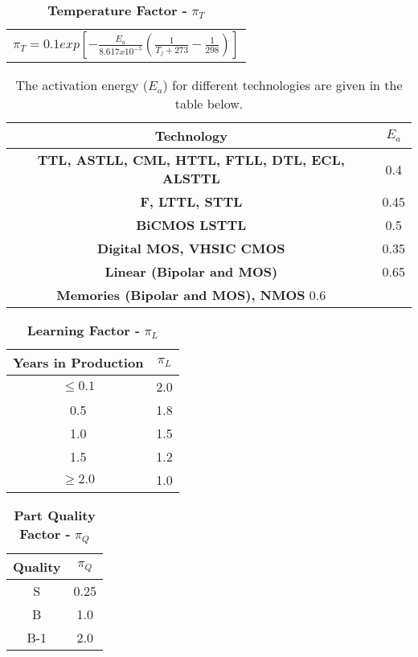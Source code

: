 \begin{table}[h]
\caption{\textbf{Temperature Factor -} $\pi_{T}$}
\label{table:tempFactorIc}
\begin{tabular}{l} 
$\pi_{T} = 0.1 exp[-\frac{E_{a}}{8.617x10^{-5}} (\frac{1}{T_j + 273} - \frac{1}{298})]$ \\
\end{tabular}
\end{table}

\begin{table}[h]
\caption{ The activation energy ($E_{a}$) for different technologies are given in the table below.}
\label{activationEnergyIc}
\begin{tabular}{|c|c|} \hline
\rowcolor{Gray}
\textbf{Technology}& $E_{a}$ \\ \hline
\textbf{TTL, ASTLL, CML, HTTL, FTLL, DTL, ECL, ALSTTL} & 0.4 \\ \hline
\textbf{F, LTTL, STTL} & 0.45 \\ \hline
\textbf{BiCMOS LSTTL} & 0.5 \\ \hline
\textbf{Digital MOS, VHSIC CMOS} & 0.35 \\ \hline
\textbf{Linear (Bipolar and MOS)}&  0.65 \\ \hline
\textbf{Memories (Bipolar and MOS), NMOS}  0.6 \\ \hline
\end{tabular}
\end{table}

\begin{table}[h]
\caption{\textbf{Learning Factor -} $\pi_{L}$}
\label{table:learningFactorIc}
\begin{tabular}{|c|c|} \hline
\rowcolor{Gray}
\textbf{Years in Production} & $\pi_{L}$ \\ \hline
$\leq 0.1$ & 2.0 \\ \hline
0.5 & 1.8 \\ \hline
1.0 & 1.5 \\ \hline
1.5 & 1.2 \\ \hline
$\geq 2.0$ & 1.0 \\ \hline
\end{tabular}
\end{table}


\begin{table}[h]
\caption{\textbf{Part Quality  Factor -} $\pi_{Q}$}
\label{table:partQualityFactorIc}
\begin{tabular}{|c|c|} \hline
\rowcolor{Gray}
\textbf{Quality} & $\pi_{Q}$ \\ \hline
S & 0.25 \\ \hline
B & 1.0 \\ \hline
B-1 & 2.0 \\ \hline
\end{tabular}
\end{table}


